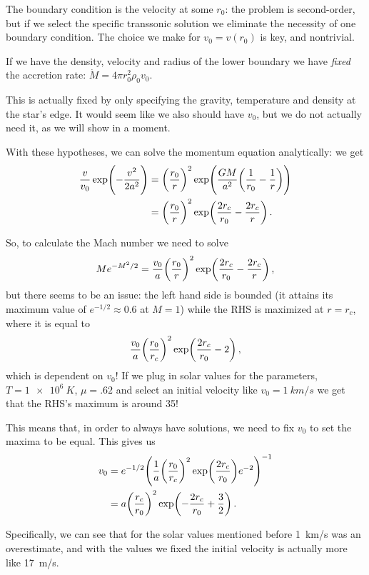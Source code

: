 \documentclass[main.tex]{subfiles}
\begin{document}
The boundary condition is the velocity at some \(r_0 \): the problem is second-order, but if we select the specific transsonic solution we eliminate the necessity of one boundary condition.
The choice we make for \(v_0  = v(r_0)\) is key, and nontrivial.

If we have the density, velocity and radius of the lower boundary we have \emph{fixed} the accretion rate: \(\dot{M}  = 4 \pi r_0^2 \rho_0 v_0 \). 

This is actually fixed by only specifying the gravity, temperature and density at the star's edge. It would seem like we also should have \(v_0 \), but we do not actually need it, as we will show in a moment.

With these hypotheses, we can solve the momentum equation analytically: we get 
%
\begin{align}
\frac{v}{v_0 } \exp( -\frac{v^2}{2 a^2}) &= \qty(\frac{r_0}{r})^2 \exp(\frac{GM}{a^2} \qty(\frac{1}{r_0 } - \frac{1}{r}))  \\
&= \qty(\frac{r_0}{r})^2 \exp(\frac{2r_c}{r_0 } - \frac{2r_c}{r})
\,.
\end{align}
%

\begin{bluebox}
So, to calculate the Mach number we need to solve 
%
\begin{align}
M e^{-M^2/2} = \frac{v_0 }{a} \qty(\frac{r_0 }{r})^2 \exp(\frac{2r_c}{r_0 } - \frac{2 r_c}{r})
\,,
\end{align}
%
but there seems to be an issue: the left hand side is bounded (it attains its maximum value of \(e^{-1/2} \approx 0.6\) at \(M=1\)) while the RHS is maximized at \(r = r_c\), where it is equal to 
%
\begin{align}
\frac{v_0}{a} \qty(\frac{r_0 }{r_c})^2 \exp(\frac{2r_c}{r_0 } - 2)
\,,
\end{align}
%
which is dependent on \(v_0 \)! If we plug in solar values for the parameters, \(T = \SI{1e6}{K}\), \(\mu = \num{.62}\) and select an initial velocity like \(v_0 = \SI{1}{km/s}\) we get that the RHS's maximum is around 35! 

This means that, in order to always have solutions, we need to fix \(v_0 \) to set the maxima to be equal.
This gives us 
%
\begin{align}
v_0 &= e^{-1/2}  \qty(\frac{1}{a} \qty(\frac{r_0}{r_c})^2
\exp(\frac{2 r_c}{r_0 }) e^{-2})^{-1} \\
&= a \qty(\frac{r_c}{r_0 })^2 \exp(-  \frac{2r_c}{r_0 } + \frac{3}{2})
\,.
\end{align}

Specifically, we can see that for the solar values mentioned before \SI{1}{km/s} was an overestimate, and with the values we fixed the initial velocity is actually more like \SI{17}{m/s}.
\end{bluebox}
\end{document}

